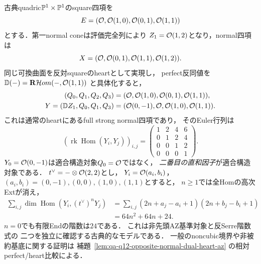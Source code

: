 \begin{example}[古典quadric上の非先頭構造対象による相対AZの検証]
\label{ex:qa-q12-classical-dual-noninitial-az}
古典quadric$\mathbb P^1\times\mathbb P^1$のsquare四項を
\[
 E=(\mathcal O,\mathcal O(1,0),\mathcal O(0,1),\mathcal O(1,1))
\]
とする．第一normal coneは評価完全列により
$Z_1=\mathcal O(1,2)$となり，normal四項は
\[
 X=(\mathcal O,\mathcal O(0,1),\mathcal O(1,1),\mathcal O(1,2)).
\]
同じ可換曲面を反対squareのheartとして実現し，
perfect反同値を
$\mathbb D(-)=\mathbf R\mathcal Hom(-,\mathcal O(1,1))$
と具体化すると，
\[
 \begin{split}
 (Q_0,Q_1,Q_2,Q_3)
     &=(\mathcal O,\mathcal O(1,0),\mathcal O(0,1),\mathcal O(1,1)),\\
 Y=(\mathbb DZ_1,Q_0,Q_1,Q_3)
     &=(\mathcal O(0,-1),\mathcal O,\mathcal O(1,0),\mathcal O(1,1)).
 \end{split}
\]
これは通常のheartにあるfull strong normal四項であり，
そのEuler行列は
\[
 \left(\operatorname{rk}\operatorname{Hom}(Y_i,Y_j)\right)_{i,j}
 =\begin{pmatrix}1&2&4&6\\0&1&2&4\\
                         0&0&1&2\\0&0&0&1\end{pmatrix}.
\]
$Y_0=\mathcal O(0,-1)$は適合構造対象$Q_0=\mathcal O$ではなく，
\emph{二番目の直和因子}が適合構造対象である．
$t^\vee=-\otimes\mathcal O(2,2)$とし，
$Y_i=\mathcal O(a_i,b_i)$，$(a_i,b_i)=
(0,-1),(0,0),(1,0),(1,1)$とすると，
$n\ge1$では全Homの高次Extが消え，
\[
 \begin{split}
 \sum_{i,j}\dim\operatorname{Hom}
    (Y_i,(t^\vee)^nY_j)
 &=\sum_{i,j}
    (2n+a_j-a_i+1)(2n+b_j-b_i+1)\\
 &=64n^2+64n+24.
 \end{split}
\]
$n=0$でも有限Endの階数は$24$である．
これは非先頭AZ基準対象と反Serre階数式の
二つを独立に確認する古典的なモデルである．
一般のnoncubic境界や非被約基底に関する証明は
補題~\ref{lem:qa-q12-opposite-normal-dual-heart-az}
の相対perfect/heart比較による．
\end{example}


